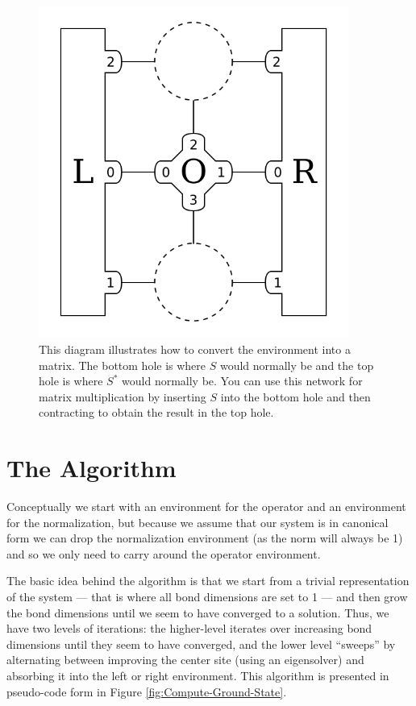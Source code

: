 \documentclass{article}
\newcommand{\diagramwidth}{4in}
\begin{document}
\begin{figure}\begin{center}
\includegraphics[width=\diagramwidth]{drawings/matmul-car}
\caption{\label{fig:matmul-car}This diagram illustrates how to convert the environment into a matrix.  The bottom hole is where $S$ would normally be and the top hole is where $S^*$ would normally be.  You can use this network for matrix multiplication by inserting $S$ into the bottom hole and then contracting to obtain the result in the top hole.}
\end{center}\end{figure}

\clearpage

\section{The Algorithm}

Conceptually we start with an environment for the operator and an environment for the normalization, but because we assume that our system is in canonical form we can drop the normalization environment (as the norm will always be 1) and so we only need to carry around the operator environment.

The basic idea behind the algorithm is that we start from a trivial representation of the system --- that is where all bond dimensions are set to 1 --- and then grow the bond dimensions until we seem to have converged to a solution.  Thus, we have two levels of iterations:  the higher-level iterates over increasing bond dimensions until they seem to have converged, and the lower level ``sweeps'' by alternating between improving the center site (using an eigensolver) and absorbing it into the left or right environment.  This algorithm is presented in pseudo-code form in Figure \ref{fig:Compute-Ground-State}.
\end{document}
